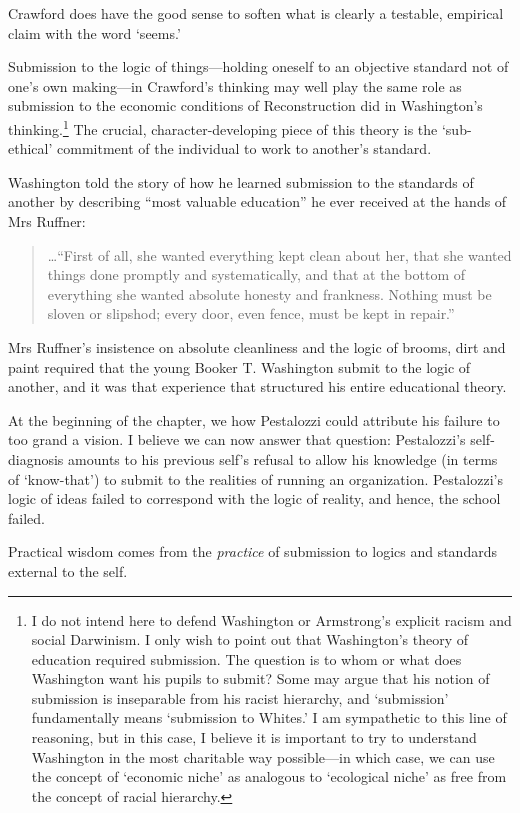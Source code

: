Crawford does have the good sense to soften what is clearly a testable, empirical claim with the word `seems.'

Submission to the logic of things---holding oneself to an objective standard not of one's own making---in Crawford's thinking may well play the same role as submission to the economic conditions of Reconstruction did in Washington's thinking.\footnote{I do not intend here to defend Washington or Armstrong's explicit racism and social Darwinism. I only wish to point out that Washington's theory of education required submission. The question is to whom or what does Washington want his pupils to submit? Some may argue that his notion of submission is inseparable from his racist hierarchy, and `submission' fundamentally means `submission to Whites.' I am sympathetic to this line of reasoning, but in this case, I believe it is important to try to understand Washington in the most charitable way possible---in which case, we can use the concept of `economic niche' as analogous to `ecological niche' as free from the concept of racial hierarchy.} The crucial, character-developing piece of this theory is the `sub-ethical' commitment of the individual to work to another's standard.

Washington told the story of how he learned submission to the standards of another by describing ``most valuable education'' he ever received at the hands of Mrs Ruffner:

\begin{quote}

{\ldots}``First of all, she wanted everything kept clean about her, that she wanted things done promptly and systematically, and that at the bottom of everything she wanted absolute honesty and frankness. Nothing must be sloven or slipshod; every door, even fence, must be kept in repair.'' ~\citep[p. 26]{Washington:1952uf}
\end{quote}

Mrs Ruffner's insistence on absolute cleanliness and the logic of brooms, dirt and paint required that the young Booker T. Washington submit to the logic of another, and it was that experience that structured his entire educational theory.

At the beginning of the chapter, we how Pestalozzi could attribute his failure to too grand a vision. I believe we can now answer that question: Pestalozzi's self-diagnosis amounts to his previous self's refusal to allow his knowledge (in terms of `know-that') to submit to the realities of running an organization. Pestalozzi's logic of ideas failed to correspond with the logic of reality, and hence, the school failed.
\begin{purpose}\label{def:forvocation-practice}
Practical wisdom comes from the \emph{practice} of submission to logics and standards external to the self. 
\end{purpose}

